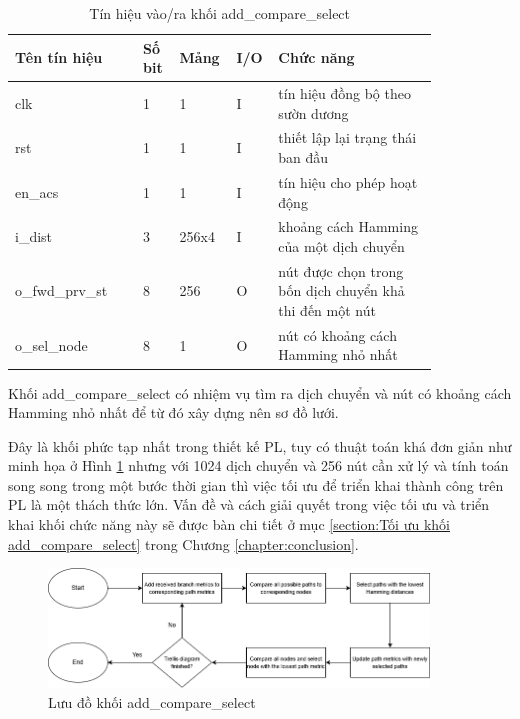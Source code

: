 \documentclass[../DoAn.tex]{subfiles}
\begin{document}
\begin{table}[H]
\centering{}
    \caption{Tín hiệu vào/ra khối add\_compare\_select}
    \begin{tabular}{|p{0.28\linewidth}|p{0.08\linewidth}|p{0.08\linewidth}|p{0.05\linewidth}|p{0.35\linewidth}|}
        \hline
        \textbf{Tên tín hiệu} & \textbf{Số bit}  & \textbf{Mảng}     & \textbf{I/O}   & \textbf{Chức năng} \\ \hline\hline
        clk  & 1   & 1     & I     & tín hiệu đồng bộ theo sườn dương \\ \hline
        rst   & 1   & 1     & I     & thiết lập lại trạng thái ban đầu\\ \hline
        en\_acs  & 1   & 1     & I     & tín hiệu cho phép hoạt động \\ \hline
        i\_dist  & 3   & 256x4     & I     & khoảng cách Hamming của một dịch chuyển  \\ \hline
        o\_fwd\_prv\_st  & 8   & 256     & O     & nút được chọn trong bốn dịch chuyển khả thi đến một nút \\ \hline
        o\_sel\_node  & 8   & 1     & O     & nút có khoảng cách Hamming nhỏ nhất  \\ \hline
        \end{tabular}
\end{table}

Khối add\_compare\_select có nhiệm vụ tìm ra dịch chuyển và nút có khoảng cách Hamming nhỏ nhất để từ đó xây dựng nên sơ đồ lưới.

Đây là khối phức tạp nhất trong thiết kế PL, tuy có thuật toán khá đơn giản như minh họa ở Hình \ref{fig:Lưu đồ khối add_compare_select} nhưng với 1024 dịch chuyển và 256 nút cần xử lý và tính toán song song trong một bước thời gian thì việc tối ưu để triển khai thành công trên PL là một thách thức lớn. Vấn đề và cách giải quyết trong việc tối ưu và triển khai khối chức năng này sẽ được bàn chi tiết ở mục \ref{section:Tối ưu khối add_compare_select} trong Chương \ref{chapter:conclusion}.

\begin{figure}[H]
    \centering
    \includegraphics[width=0.9\textwidth, height=0.3\textheight, keepaspectratio]{Hinhve/Chuong 4/add compare select flow chart.png}
    \caption{Lưu đồ khối add\_compare\_select}
    \label{fig:Lưu đồ khối add_compare_select}
\end{figure}
\end{document}
